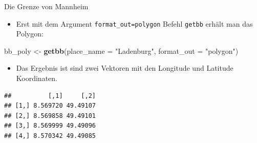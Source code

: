 \documentclass[ignorenonframetext,]{beamer}
\newenvironment{Shaded}{\begin{snugshade}}{\end{snugshade}}
\newcommand{\KeywordTok}[1]{\textcolor[rgb]{0.13,0.29,0.53}{\textbf{#1}}}
\newcommand{\DataTypeTok}[1]{\textcolor[rgb]{0.13,0.29,0.53}{#1}}
\newcommand{\StringTok}[1]{\textcolor[rgb]{0.31,0.60,0.02}{#1}}
\newcommand{\NormalTok}[1]{#1}
\providecommand{\tightlist}{%
  \setlength{\itemsep}{0pt}\setlength{\parskip}{0pt}}
\begin{document}
\begin{frame}[fragile]{Die Grenze von Mannheim}

\begin{itemize}
\tightlist
\item
  Erst mit dem Argument \texttt{format\_out=polygon} Befehl
  \texttt{getbb} erhält man das Polygon:
\end{itemize}

\begin{Shaded}
\begin{Highlighting}[]
\NormalTok{bb_poly <-}\StringTok{ }\KeywordTok{getbb}\NormalTok{(}\DataTypeTok{place_name =} \StringTok{"Ladenburg"}\NormalTok{, }
                 \DataTypeTok{format_out =} \StringTok{"polygon"}\NormalTok{)}
\end{Highlighting}
\end{Shaded}

\begin{itemize}
\tightlist
\item
  Das Ergebnis ist sind zwei Vektoren mit den Longitude und Latitude
  Koordinaten.
\end{itemize}

\begin{verbatim}
##          [,1]     [,2]
## [1,] 8.569720 49.49107
## [2,] 8.569858 49.49101
## [3,] 8.569999 49.49096
## [4,] 8.570342 49.49085
\end{verbatim}

\end{frame}
\end{document}
